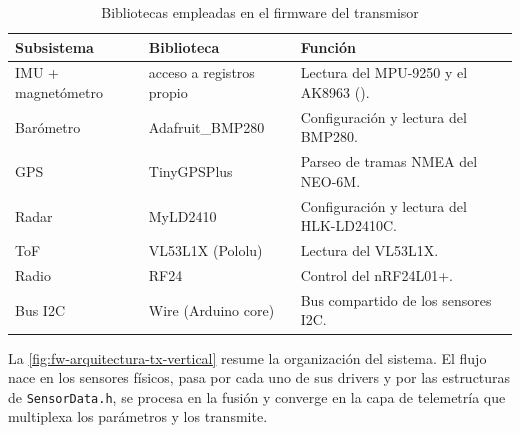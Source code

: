 \begin{table}[H]
    \centering
    \caption{Bibliotecas empleadas en el firmware del transmisor}
    \label{tab:fw_libs}
    \footnotesize
    \begin{tabularx}{\linewidth}{l l X}
        \toprule
        \textbf{Subsistema} & \textbf{Biblioteca} & \textbf{Función} \\
        \midrule
        IMU + magnetómetro & acceso a registros propio & Lectura del MPU-9250 y el AK8963 (\cite{kriswiner_mpu9250}). \\
        Barómetro          & Adafruit\_BMP280 \cite{lib_bmp280} & Configuración y lectura del BMP280. \\
        GPS                & TinyGPSPlus \cite{lib_tinygps} & Parseo de tramas NMEA del NEO-6M. \\
        Radar              & MyLD2410 \cite{lib_myld2410} & Configuración y lectura del HLK-LD2410C. \\
        ToF                & VL53L1X (Pololu) \cite{lib_vl53l1x} & Lectura del VL53L1X. \\
        Radio              & RF24 \cite{lib_rf24} & Control del nRF24L01+. \\
        Bus I2C            & Wire (Arduino core) & Bus compartido de los sensores I2C. \\
        \bottomrule
    \end{tabularx}
\end{table}

La \cref{fig:fw-arquitectura-tx-vertical} resume la organización del sistema. El flujo
nace en los sensores físicos, pasa por cada uno de sus drivers y por las
estructuras de \texttt{SensorData.h}, se procesa en la fusión y converge en la
capa de telemetría que multiplexa los parámetros y los transmite.

